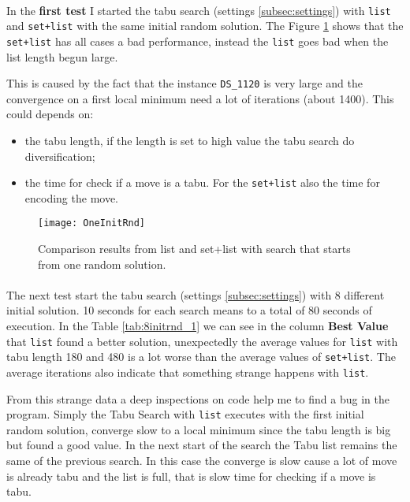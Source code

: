 	
	
	\paragraph*{}
	In the \textbf{first test} I started the tabu search (settings \ref{subsec:settings}) with \verb|list| and \verb|set+list| with the same initial random solution. The Figure \ref{fig:oneinitrnd} shows that the \verb|set+list| has all cases a bad performance, instead the \verb|list| goes bad when the list length begun large.
	
	This is caused by the fact that the instance \verb|DS_1120| is very large and the convergence on a first local minimum need a lot of iterations (about 1400). This could depends on:
	\begin{itemize}
		\item the tabu length, if the length is set to high value the tabu search do diversification;
		\item the time for check if a move is a tabu. For the \verb|set+list| also the time for encoding the move.
	\end{itemize} 
	
	\begin{figure}
		\centering
		\texttt{[image: OneInitRnd]}
		\caption{Comparison results from list and set+list with search that starts from one random solution.}
		\label{fig:oneinitrnd}
	\end{figure}
	
	
	\paragraph*{}
	The next test start the tabu search (settings \ref{subsec:settings}) with 8 different initial solution. 10 seconds for each search means to a total of 80 seconds of execution. In the Table \ref{tab:8initrnd_1} we can see in the column \textbf{Best Value} that \verb|list| found a better solution, unexpectedly the average values for \verb|list| with tabu length 180 and 480 is a lot worse than the average values of \verb|set+list|. The average iterations also indicate that something strange happens with \verb|list|. 
	
	From this strange data a deep inspections on code help me to find a bug in the program. Simply the Tabu Search with \verb|list| executes with the first initial random solution, converge slow to a local minimum since the tabu length is big but found a good value. In the next start of the search the Tabu list remains the same of the previous search. In this case the converge is slow cause a lot of move is already tabu and the list is full, that is slow time for checking if a move is tabu.
	
